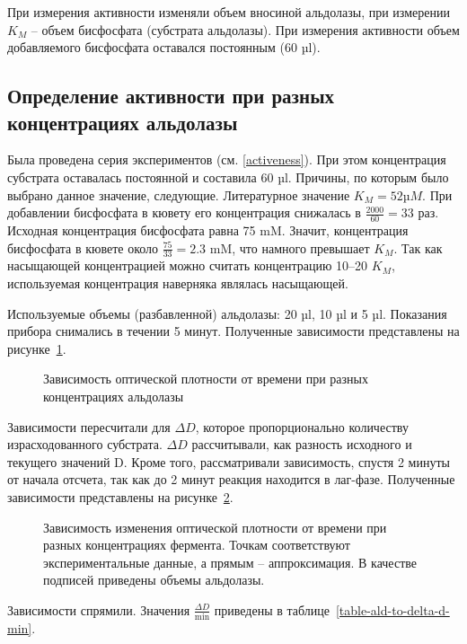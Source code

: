 При измерения активности изменяли объем вносиной альдолазы,
при измерении $K_M$ -- объем бисфосфата (субстрата альдолазы).
При измерения активности объем добавляемого
бисфосфата оставался постоянным (60 µl).

\subsection{Определение активности при разных концентрациях альдолазы}
Была проведена серия экспериментов (см. \ref{activeness}).
При этом концентрация субстрата оставалась постоянной и составила 60 µl.
Причины, по которым было выбрано данное значение, следующие.
Литературное значение $K_M = 52 µM$.
При добавлении бисфосфата в кювету его концентрация снижалась в $\frac{2000}{60} = 33$ раз.
Исходная концентрация бисфосфата равна 75 mM.
Значит, концентрация бисфосфата в кювете около $\frac{75}{33} = 2.3$ mM,
что намного превышает $K_M$.
Так как насыщающей концентрацией можно считать концентрацию 10--20 $K_M$,
используемая концентрация наверняка являлась насыщающей.

Используемые объемы (разбавленной) альдолазы: 20 µl, 10 µl и 5 µl.
Показания прибора снимались в течении 5 минут.
Полученные зависимости представлены на рисунке~\ref{act-time-to-d}.

\begin{figure}[htbp]

\caption{Зависимость оптической плотности от времени
    при разных концентрациях альдолазы}
\label{act-time-to-d}
\end{figure}

Зависимости пересчитали для $\Delta D$,
которое пропорционально количеству израсходованного субстрата.
$\Delta D$ рассчитывали, как разность исходного и текущего значений D.
Кроме того, рассматривали зависимость, спустя 2 минуты от начала отсчета,
так как до 2 минут реакция находится в лаг-фазе.
Полученные зависимости представлены на рисунке~\ref{act-time-to-delta-d}.

\begin{figure}[htbp]

\caption{Зависимость изменения оптической плотности от времени
    при разных концентрациях фермента.
    Точкам соответствуют экспериментальные данные, а прямым -- аппроксимация.
    В качестве подписей приведены объемы альдолазы.}
\label{act-time-to-delta-d}
\end{figure}

Зависимости спрямили.
Значения $\frac{\Delta D}{\text{min}}$ приведены
в таблице~\ref{table-ald-to-delta-d-min}.

